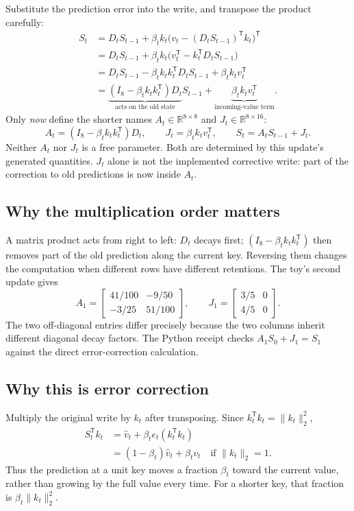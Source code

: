 \documentclass[10pt,letterpaper]{article}
\newcommand{\R}{\mathbb{R}}
\begin{document}
Substitute the prediction error into the write, and transpose the product carefully:
\begin{align}
S_t&=D_tS_{t-1}+\beta_t k_t\bigl(v_t-(D_tS_{t-1})^{\mathsf T}k_t\bigr)^{\mathsf T}\\
&=D_tS_{t-1}+\beta_t k_t\bigl(v_t^{\mathsf T}-k_t^{\mathsf T}D_tS_{t-1}\bigr)\\
&=D_tS_{t-1}-\beta_t k_tk_t^{\mathsf T}D_tS_{t-1}+\beta_t k_tv_t^{\mathsf T}\\
&=\underbrace{(I_8-\beta_t k_tk_t^{\mathsf T})D_t}_{\text{acts on the old state}}S_{t-1}
+\underbrace{\beta_t k_tv_t^{\mathsf T}}_{\text{incoming-value term}}.
\end{align}
Only \emph{now} define the shorter names $A_t\in\R^{8\times8}$ and $J_t\in\R^{8\times16}$:
\begin{equation}
A_t=(I_8-\beta_t k_tk_t^{\mathsf T})D_t,\qquad J_t=\beta_t k_tv_t^{\mathsf T},\qquad
S_t=A_tS_{t-1}+J_t.\label{eq:transition}
\end{equation}
Neither $A_t$ nor $J_t$ is a free parameter. Both are determined by this update's generated quantities. $J_t$ alone is not the implemented corrective write: part of the correction to old predictions is now inside $A_t$.

\subsection{Why the multiplication order matters}
A matrix product acts from right to left: $D_t$ decays first; $(I_8-\beta_t k_tk_t^{\mathsf T})$ then removes part of the old prediction along the current key. Reversing them changes the computation when different rows have different retentions. The toy's second update gives
\begin{equation}
A_1=\begin{bmatrix}41/100&-9/50\\-3/25&51/100\end{bmatrix},\qquad
J_1=\begin{bmatrix}3/5&0\\4/5&0\end{bmatrix}.
\end{equation}
The two off-diagonal entries differ precisely because the two columns inherit different diagonal decay factors. The Python receipt checks $A_1S_0+J_1=S_1$ against the direct error-correction calculation.

\subsection{Why this is error correction}
Multiply the original write by $k_t$ after transposing. Since $k_t^{\mathsf T}k_t=\lVert k_t\rVert_2^2$,
\begin{align}
S_t^{\mathsf T}k_t
&=\widehat v_t+\beta_t e_t(k_t^{\mathsf T}k_t)\\
&=(1-\beta_t)\widehat v_t+\beta_t v_t\quad\text{if }\lVert k_t\rVert_2=1.
\end{align}
Thus the prediction at a unit key moves a fraction $\beta_t$ toward the current value, rather than growing by the full value every time. For a shorter key, that fraction is $\beta_t\lVert k_t\rVert_2^2$.
\end{document}

